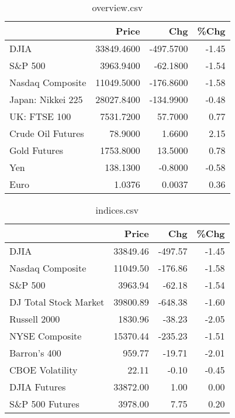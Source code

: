 \documentclass{article}%
\begin{document}
\begin{table}[htbp]%
\caption{overview.csv}%
\centering%
\begin{adjustbox}{width=1\textwidth}%
\begin{tabular}{lrrr}
\toprule
                  &      Price &       Chg &  \%Chg \\
\midrule
             DJIA & 33849.4600 & -497.5700 & -1.45 \\
          S\&P 500 &  3963.9400 &  -62.1800 & -1.54 \\
 Nasdaq Composite & 11049.5000 & -176.8600 & -1.58 \\
Japan: Nikkei 225 & 28027.8400 & -134.9900 & -0.48 \\
     UK: FTSE 100 &  7531.7200 &   57.7000 &  0.77 \\
Crude Oil Futures &    78.9000 &    1.6600 &  2.15 \\
     Gold Futures &  1753.8000 &   13.5000 &  0.78 \\
              Yen &   138.1300 &   -0.8000 & -0.58 \\
             Euro &     1.0376 &    0.0037 &  0.36 \\
\bottomrule
\end{tabular}
%
\end{adjustbox}%
\end{table}

%


\begin{table}[htbp]%
\caption{indices.csv}%
\centering%
\begin{adjustbox}{width=1\textwidth}%
\begin{tabular}{lrrr}
\toprule
                      &    Price &     Chg &  \%Chg \\
\midrule
                 DJIA & 33849.46 & -497.57 & -1.45 \\
     Nasdaq Composite & 11049.50 & -176.86 & -1.58 \\
              S\&P 500 &  3963.94 &  -62.18 & -1.54 \\
DJ Total Stock Market & 39800.89 & -648.38 & -1.60 \\
         Russell 2000 &  1830.96 &  -38.23 & -2.05 \\
       NYSE Composite & 15370.44 & -235.23 & -1.51 \\
         Barron's 400 &   959.77 &  -19.71 & -2.01 \\
      CBOE Volatility &    22.11 &   -0.10 & -0.45 \\
         DJIA Futures & 33872.00 &    1.00 &  0.00 \\
      S\&P 500 Futures &  3978.00 &    7.75 &  0.20 \\
\bottomrule
\end{tabular}
%
\end{adjustbox}%
\end{table}
\end{document}
